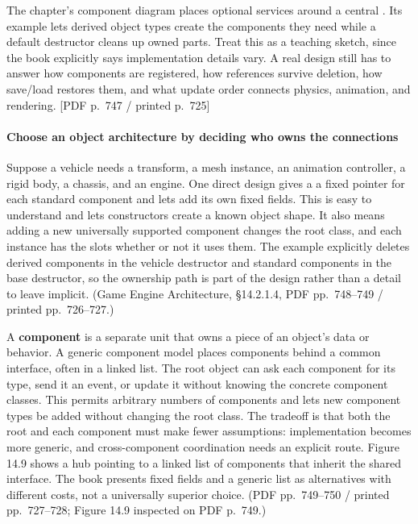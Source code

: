 The chapter's component diagram places optional services around a central . Its example lets derived object types create the components they need while a default destructor cleans up owned parts. Treat this as a teaching sketch, since the book explicitly says implementation details vary. A real design still has to answer how components are registered, how references survive deletion, how save/load restores them, and what update order connects physics, animation, and rendering. {[}PDF p.~747 / printed p.~725{]}

\paragraph{Choose an object architecture by deciding who owns the connections}\label{06-engine-ii-ch041-choose-an-object-architecture-by-deciding-who-owns-the-connections}

\hypertarget{06-engine-ii-ch041-choose-an-object-architecture-by-deciding-who-owns-the-connections}{}

Suppose a vehicle needs a transform, a mesh instance, an animation controller, a rigid body, a chassis, and an engine. One direct design gives a  a fixed pointer for each standard component and lets  add its own fixed fields. This is easy to understand and lets constructors create a known object shape. It also means adding a new universally supported component changes the root class, and each instance has the slots whether or not it uses them. The example explicitly deletes derived components in the vehicle destructor and standard components in the base destructor, so the ownership path is part of the design rather than a detail to leave implicit. (Game Engine Architecture, §14.2.1.4, PDF pp.~748--749 / printed pp.~726--727.)

A \textbf{component} is a separate unit that owns a piece of an object's data or behavior. A generic component model places components behind a common interface, often in a linked list. The root object can ask each component for its type, send it an event, or update it without knowing the concrete component classes. This permits arbitrary numbers of components and lets new component types be added without changing the root class. The tradeoff is that both the root and each component must make fewer assumptions: implementation becomes more generic, and cross-component coordination needs an explicit route. Figure 14.9 shows a  hub pointing to a linked list of components that inherit the shared interface. The book presents fixed fields and a generic list as alternatives with different costs, not a universally superior choice. (PDF pp.~749--750 / printed pp.~727--728; Figure 14.9 inspected on PDF p.~749.)

